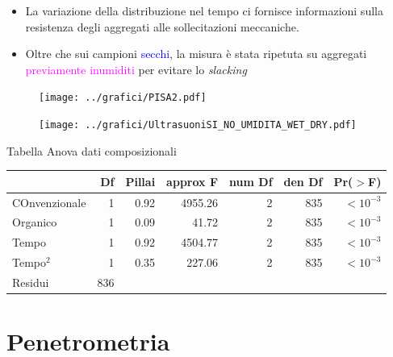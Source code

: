 \begin{frame}
  \footnotesize
  \begin{itemize}
  \item La variazione della distribuzione nel tempo ci fornisce
    informazioni sulla resistenza degli aggregati alle sollecitazioni
    meccaniche.
  \item Oltre che sui campioni \textcolor{blue}{secchi}, la misura
    \`e stata ripetuta su aggregati 
    \textcolor{magenta}{previamente inumiditi} per evitare lo \textit{slacking}
  \end{itemize}

  \begin{figure}
    \texttt{[image: ../grafici/PISA2.pdf]}
  \end{figure}
\end{frame}

\begin{frame}
  \begin{figure}
    \texttt{[image: ../grafici/UltrasuoniSI\_NO\_UMIDITA\_WET\_DRY.pdf]}
  \end{figure}
\end{frame}

\begin{frame}{Tabella Anova dati composizionali}
\footnotesize
  \begin{table}
    \centering
    \begin{tabular}{lrrrrrr}
      \hline
      & Df & Pillai & approx F & num Df & den Df & Pr($>$F) \\ 
      \hline
      COnvenzionale & 1 & 0.92 & 4955.26 & 2 & 835 & $<10^{-3}$ \\ 
      Organico  & 1 & 0.09 & 41.72 & 2 & 835 &  $<10^{-3}$ \\ 
      Tempo & 1 & 0.92 & 4504.77 & 2 & 835 &  $<10^{-3}$  \\ 
      Tempo$^2$& 1 & 0.35 & 227.06 & 2 & 835 &  $<10^{-3}$ \\ 
      Residui & 836 &  &  &  &  &  \\ 
      \hline
    \end{tabular}
  \end{table}
\end{frame}




\part{Penetrometria}


